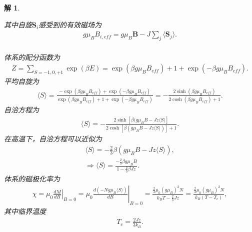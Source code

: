 \documentclass[UTF8,10pt,a4paper]{article}
\theoremstyle{Problem}
\theoremstyle{Solution}
\newtheorem*{sol}{解}
\begin{document}
\begin{sol}
\begin{enumerate}
        其中自旋$\bm{S}_i$感受到的有效磁场为
        \begin{align}
            g\mu_BB_{i,eff}=g\mu_B\bm{B}-J\sum_j\langle\bm{S}_j\rangle.
        \end{align}\\
        体系的配分函数为
        \begin{align}
            Z=\sum_{S=-1,0,+1}\exp(\beta E)=\exp(\beta g\mu_BB_{eff})+1+\exp(-\beta g\mu_BB_{eff}).
        \end{align}
        平均自旋为
        \begin{align}
            \langle S\rangle=\frac{-\exp(\beta g\mu_BB_{eff})+\exp(-\beta g\mu_BB_{eff})}{\exp(\beta g\mu_BB_{eff})+1+\exp(-\beta g\mu_BB_{eff})}=-\frac{2\sinh(\beta g\mu_BB_{eff})}{2\cosh(\beta g\mu_BB_{eff})+1}.
        \end{align}
        自洽方程为
        \begin{align}
            \langle S\rangle=-\frac{2\sinh[\beta(g\mu_BB-Jz\langle S\rangle]}{2\cosh[\beta(g\mu_BB-Jz\langle S\rangle)]+1}.
        \end{align}
        在高温下，自洽方程可以近似为
        \begin{gather}
            \langle S\rangle=-\frac{2}{3}\beta(g\mu_BB-Jz\langle S\rangle),\\
            \Longrightarrow\langle S\rangle=\frac{-\frac{2}{3}\beta g\mu_BB}{1-\frac{2}{3}\beta Jz}.
        \end{gather}
        体系的磁极化率为
        \begin{align}
            \chi=\mu_0\left.\frac{dM}{dB}\right\rvert_{B=0}=\mu_0\left.\frac{d(-Ng\mu_B\langle S\rangle)}{dB}\right\rvert_{B=0}=\frac{\frac{2}{3}\mu_0(g\mu_B)^2N}{k_BT-\frac{2}{3}Jz}=\frac{\frac{2}{3}\mu_0(g\mu_B)^2N}{k_B(T-T_c)},
        \end{align}
        其中临界温度
        \begin{align}
            T_c=\frac{2Jz}{3k_B}.
        \end{align}
    \end{enumerate}
\end{sol}
\end{document}
